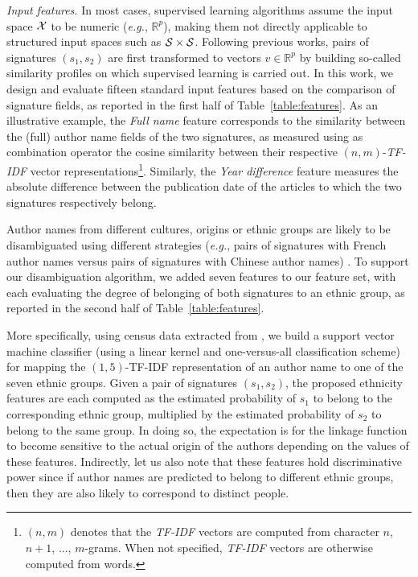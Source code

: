 \documentclass{article}
\newcommand{\eg}{\emph{e.g.}\xspace}
\begin{document}
\textit{Input features.} In most cases, supervised learning algorithms assume
the input space ${\cal X}$ to be numeric (\eg, $\mathbb{R}^p$), making them
not directly applicable to structured input spaces such as ${\cal S} \times
{\cal S}$.
Following previous works, pairs of signatures $(s_1, s_2)$ are first transformed to vectors $v \in \mathbb{R}^p$
by building so-called similarity profiles \citep{treeratpituk2009disambiguating} on which supervised learning is carried out.
In this work, we design and evaluate fifteen standard input
features based on the comparison of signature fields, as reported in the first
half of Table~\ref{table:features}.
As an illustrative example, the \textit{Full name} feature corresponds to the similarity between the (full)
author name fields of the two signatures, as measured using as combination
operator the cosine similarity between their respective $(n,m)$-\emph{TF-IDF} vector
representations\footnote{$(n,m)$ denotes that the \emph{TF-IDF} vectors are computed
from character $n$, $n+1$, ..., $m$-grams.
When not specified, \emph{TF-IDF} vectors are otherwise computed from words.}.
Similarly, the \textit{Year difference} feature measures the absolute difference between the publication date of the
articles to which the two signatures respectively belong.

Author names from different cultures, origins or ethnic groups are likely to be
disambiguated using different strategies (\eg, pairs of signatures with French
author names versus pairs of signatures with Chinese author names) \citep{treeratpituk2012name, chin2014effective}.
To support our disambiguation algorithm, we added seven features to our feature set, with each
evaluating the degree of belonging of both signatures to an ethnic group,
as reported in the second half of Table~\ref{table:features}.

More specifically, using census data extracted from \citep{rugglesintegrated},
we build a support vector machine classifier (using a linear kernel and
one-versus-all classification scheme) for mapping the
 $(1,5)$-TF-IDF representation of an author name to one of the seven ethnic groups. Given a
pair of signatures $(s_1, s_2)$, the proposed ethnicity features are each
computed as the estimated probability of $s_1$ to belong to the corresponding
ethnic group, multiplied by the estimated probability of $s_2$ to belong to the
same group. In doing so, the expectation is for the linkage function to become
sensitive to the actual origin of the authors depending on the values of these
features. Indirectly, let us also note that these features hold discriminative
power since if author names are predicted to belong to different ethnic groups,
then they are also likely to correspond to distinct people.
\end{document}
